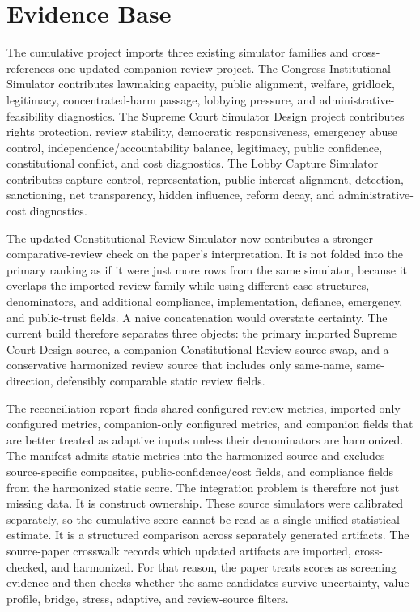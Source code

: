 \documentclass[11pt]{article}
\providecommand{\GeneratedDir}{generated}
\begin{document}
\section{Evidence Base}

The cumulative project imports three existing simulator families and cross-references one updated companion review project. The Congress Institutional Simulator contributes lawmaking capacity, public alignment, welfare, gridlock, legitimacy, concentrated-harm passage, lobbying pressure, and administrative-feasibility diagnostics. The Supreme Court Simulator Design project contributes rights protection, review stability, democratic responsiveness, emergency abuse control, independence/accountability balance, legitimacy, public confidence, constitutional conflict, and cost diagnostics. The Lobby Capture Simulator contributes capture control, representation, public-interest alignment, detection, sanctioning, net transparency, hidden influence, reform decay, and administrative-cost diagnostics.

The updated Constitutional Review Simulator now contributes a stronger comparative-review check on the paper's interpretation. It is not folded into the primary ranking as if it were just more rows from the same simulator, because it overlaps the imported review family while using different case structures, denominators, and additional compliance, implementation, defiance, emergency, and public-trust fields. A naive concatenation would overstate certainty. The current build therefore separates three objects: the primary imported Supreme Court Design source, a companion Constitutional Review source swap, and a conservative harmonized review source that includes only same-name, same-direction, defensibly comparable static review fields.






The reconciliation report finds \ReviewSharedConfiguredMetricCount{} shared configured review metrics, \ReviewImportedOnlyConfiguredMetricCount{} imported-only configured metrics, \ReviewCompanionOnlyConfiguredMetricCount{} companion-only configured metrics, and \ReviewAdaptiveCandidateCount{} companion fields that are better treated as adaptive inputs unless their denominators are harmonized. The manifest admits \ReviewHarmonizedMetricCount{} static metrics into the harmonized source and excludes source-specific composites, public-confidence/cost fields, and compliance fields from the harmonized static score. The integration problem is therefore not just missing data. It is construct ownership. These source simulators were calibrated separately, so the cumulative score cannot be read as a single unified statistical estimate. It is a structured comparison across separately generated artifacts. The source-paper crosswalk records which updated artifacts are imported, cross-checked, and harmonized. For that reason, the paper treats scores as screening evidence and then checks whether the same candidates survive uncertainty, value-profile, bridge, stress, adaptive, and review-source filters.
\end{document}

